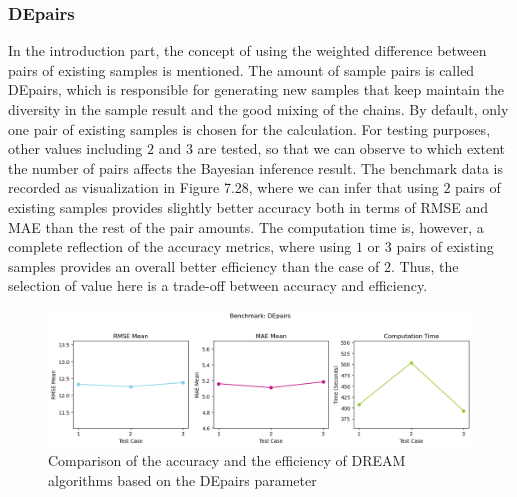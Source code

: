 \subsubsection{DEpairs}
In the introduction part, the concept of using the weighted difference between pairs of existing samples is mentioned. The amount of sample pairs is called DEpairs, which is responsible for generating new samples that keep maintain the diversity in the sample result and the good mixing of the chains. By default, only one pair of existing samples is chosen for the calculation. For testing purposes, other values including $2$ and $3$ are tested, so that we can observe to which extent the number of pairs affects the Bayesian inference result. The benchmark data is recorded as visualization in Figure 7.28, where we can infer that using $2$ pairs of existing samples provides slightly better accuracy both in terms of RMSE and MAE than the rest of the pair amounts. The computation time is, however, a complete reflection of the accuracy metrics, where using $1$ or $3$ pairs of existing samples provides an overall better efficiency than the case of $2$. Thus, the selection of value here is a trade-off between accuracy and efficiency.

\begin{figure}[H]
    \centering
    \includegraphics[width=1\textwidth]{figures/dream/DEpairs.png}
    \captionsetup{width=.8\textwidth}
    \caption{Comparison of the accuracy and the efficiency of DREAM algorithms based on the DEpairs parameter}
    \label{fig:enter-label}
\end{figure}

